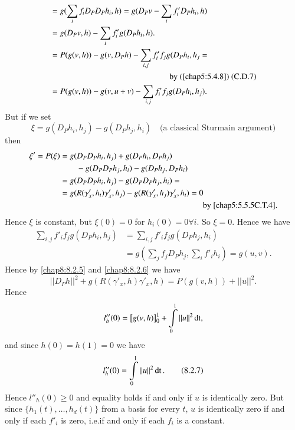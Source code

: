\subsection{}\label{chap8:8.2.6a}\pageoriginale
\begin{align*}
& =g(\sum_{i}f_{i}D_{P}D_{P}h_{i},h)=g(D_{P}v-\sum_{i}f'_{i}D_{P}h_{i},h)\\
&=g(D_{P}v,h)-\sum_{i}f'_{i}g(D_{P}h_{i},h).\\
&=P(g(v,h))-g(v,D_{P}h)-\sum_{i,j}f'_{i}f_{j}g(D_{P}h_{i},h_{j}=\\
&\hspace{5cm} \text{ by (\ref{chap5:5.4.8}) (C.D.7)}\\
& =P(g(v,h))-g(v,u+v)-\sum_{i,j}f'_{i}f_{j}g(D_{P}h_{i},h_{j}).
\end{align*}
But if we set
$$
\xi=g(D_{P}h_{i},h_{j})-g(D_{P}h_{j},h_{i})\quad\text{(a classical
  Sturmain argument)}
$$
then 
\begin{align*}
\xi'=P(\xi) &=
g(D_{P}D_{P}h_{i},h_{j})+g(D_{P}h_{i},D_{P}h_{j})\\
&\qquad-g(D_{P}D_{P}h_{j},h_{i})-g(D_{P}h_{j},D_{P}h_{i})\\
&= g(D_{P}D_{P}h_{i},h_{j})-g(D_{P}D_{P}h_{j},h_{i})=\\
&=
g(R(\gamma'_{x},h_{i})\gamma'_{x},h_{j})-g(R(\gamma'_{x},h_{j})\gamma'_{x},h_{i})=0\\
&\hspace{6cm} \text{ by \eqref{chap5:5.5.5C.T.4}.}
\end{align*}
Hence $\xi$ is constant, but $\xi(0)=0$ for $h_{i}(0)=0\forall i$. So
$\xi=0$. Hence we have
\begin{align*}
\sum_{i,j}f'_{i}f_{j}g(D_{P}h_{i},h_{j})&=\sum_{i,j}f'_{i}f_{j}g(D_{P}h_{j},h_{i})\\
&=g(\sum_{j}f_{j}D_{P}h_{j},\sum_{i}f'_{i}h_{i})=g(u,v). 
\end{align*}
Hence by \eqref{chap8:8.2.5} and \eqref{chap8:8.2.6} we have
$$
||D_{P}h||^{2}+g(R(\gamma'_{x},h)\gamma'_{x},h)=P(g(v,h))+||u||^{2}.
$$
Hence\pageoriginale
$$
l''_{h}(0)=\left[g(v,h)\right]^{1}_{0}+\int\limits^{1}_{0}||u||^{2}\operatorname{dt},
$$
and since $h(0)=h(1)=0$ we have
\begin{equation*}
l''_{h}(0)=\int\limits^{1}_{0}||u||^{2}\operatorname{dt}.\tag{8.2.7}\label{chap8:8.2.7}
\end{equation*}
Hence $l''_{h}(0)\geq 0$ and equality holds if and only if $u$ is
identically zero. But since $\{h_{1}(t),\ldots,h_{d}(t)\}$ from a
basis for every $t$, $u$ is identically zero if and only if each
$f'_{i}$ is zero, i.e.\@ if and only if each $f_{i}$ is a constant.

